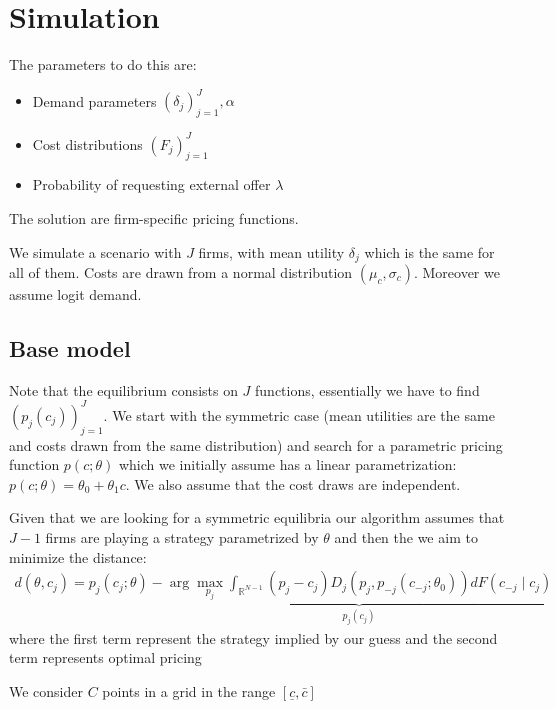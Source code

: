 \documentclass[12pt]{article}
\begin{document}
\section{Simulation}
The parameters to do this are: 
\begin{itemize}
    \item Demand parameters $(\delta_j)_{j=1}^J, \alpha$
    \item Cost distributions $(F_j)_{j=1}^J$
    \item Probability of requesting external offer $\lambda$
\end{itemize}

The solution are firm-specific pricing functions. 

\medskip

We simulate a scenario with $J$ firms, with mean utility $\delta_j$ which is the same for all of them. Costs are drawn from a normal distribution $(\mu_c, \sigma_c)$. %
Moreover we assume logit demand. 
\subsection{Base model}
Note that the equilibrium consists on $J$ functions, essentially we have to find $(p_j(c_j))_{j=1}^J$. We start with the symmetric case (mean utilities are the same and costs drawn from the same distribution) and search for a parametric pricing function $p(c; \theta)$ which we initially assume has a linear parametrization: $p(c; \theta)= \theta_0 + \theta_1 c$. We also assume that the cost draws are independent. 



\vspace{2cm}

Given that we are looking for a symmetric equilibria our algorithm assumes that $J-1$ firms are playing a strategy parametrized by $\theta$ and then 
the we aim to minimize the distance: 
\begin{align}
    d(\theta, c_j) = p_j(c_j; \theta) -\underbrace{\arg \max_{p_j} \int_{\mathbb{R}^{N-1}}^{} (p_j - c_j) D_j(p_j, p_{-j}(c_{-j}; \theta_0)) dF(c_{-j} \mid c_j)}_{p_j(c_j)}
\end{align} 
where the first term represent the strategy implied by our guess and the second term represents optimal pricing 


We consider $C$ points in a grid in the range $[\underline{c}, \bar{c}] $
\end{document}
